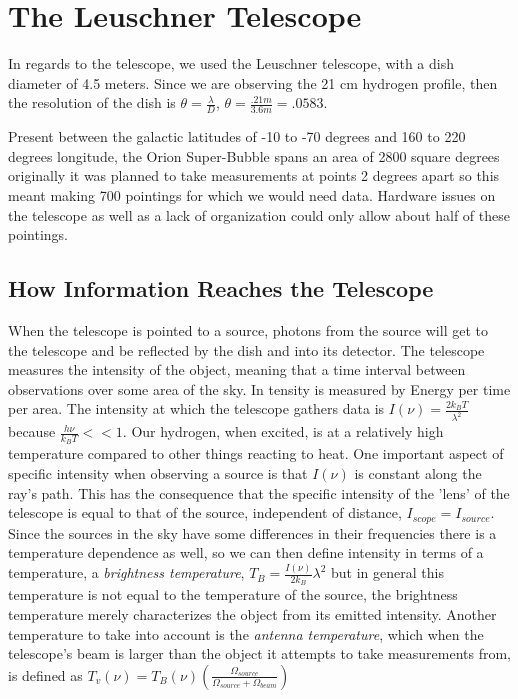 \documentclass[12 pt]{article}
\begin{document}
\section*{The Leuschner Telescope}
In regards to the telescope, we used the Leuschner telescope, with a dish
diameter of 4.5 meters. Since we are observing the 21 cm hydrogen
profile, then the resolution of the dish is $\theta =
\frac{\lambda}{D}$, $\theta = \frac{.21m}{3.6m} = .0583$. \par
Present between the galactic latitudes of -10 to -70 degrees and 160 to 220
degrees longitude, the Orion Super-Bubble spans an area of 2800  square
degrees originally it was planned to take measurements at points 2
degrees apart so this meant making 700 pointings for which we would need
data. Hardware issues on the telescope as well as a lack of organization
could only allow about half of these pointings. 
\subsection*{How Information Reaches the Telescope}
When the telescope is pointed to a source, photons from the source will
get to the telescope and be reflected by the dish and into its
detector. The telescope measures the intensity of the object, meaning
that a time interval between observations over some area of the sky. In
tensity is measured by Energy per time per area. The intensity at which
the telescope gathers data is $I(\nu) =\frac{2k_{B}T}{\lambda^2}$
because $\frac{h\nu}{k_{B}T} << 1$. Our hydrogen, when excited, is at a
relatively high temperature compared to other things reacting to
heat. One important aspect of specific intensity when observing a source
is that $I(\nu)$ is constant along the ray's path. This has the
consequence that the specific intensity of the 'lens' of the telescope
is equal to that of the source, independent of distance, $I_{scope} =
I_{source}$. Since the sources in the sky have some differences in their
frequencies there is a temperature dependence as well, so we can then
define intensity in terms of a temperature, a \textit{brightness
  temperature}, $T_{B}= \frac{I(\nu)}{2k_{B}}\lambda^2$ but in general
this temperature is not equal to the temperature of the source, the
brightness temperature merely characterizes the object from its emitted
intensity. Another temperature to take into account is the
\textit{antenna temperature}, which when the telescope's beam is larger
than the object it attempts to take measurements from,  is defined as
$T_{v}(\nu)=T_{B}(\nu)(\frac{\Omega_{source}}{\Omega_{source}+\Omega_{beam}})$ 
\end{document}
